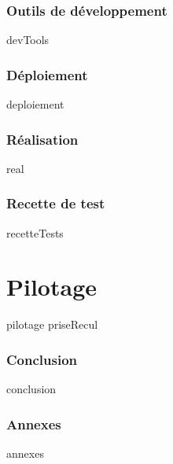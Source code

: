 \documentclass[a4paper, 12pt, titlepage, oneside, french]{article}
\begin{document}
\section{Outils de développement}
{devTools}
\newpage

\section{Déploiement}
{deploiement}
\newpage

\section{Réalisation}
{real}
\newpage

\section{Recette de test}\label{tests}
{recetteTests}
\newpage


\part{Pilotage}
{pilotage}
\newpage
{priseRecul}

\section{Conclusion}
{conclusion}
\newpage

\printglossary[title=Acronymes,type=\acronymtype]
\newpage 

\section{Annexes}
{annexes}
\newpage

\clearpage
\printglossary~\newpage 
\printbibliography~\newpage
\end{document}
